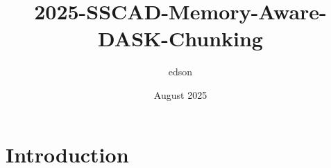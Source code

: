 \documentclass{article}
\title{2025-SSCAD-Memory-Aware-DASK-Chunking}
\author{edson }
\date{August 2025}
\begin{document}
\maketitle

\section{Introduction}
\end{document}
